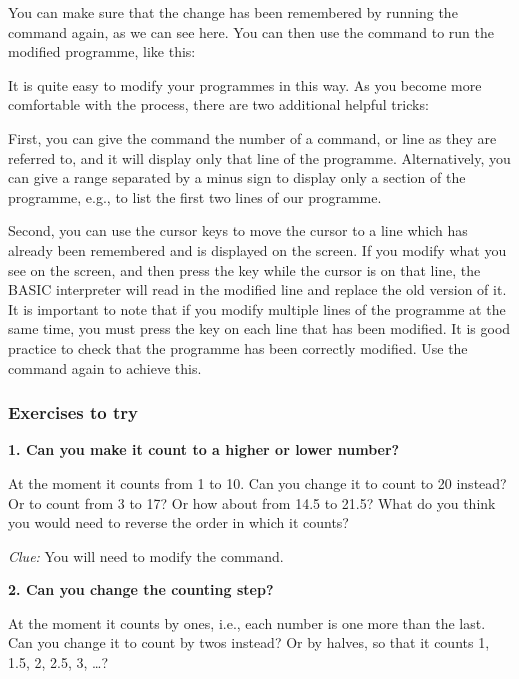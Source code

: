 You can make sure that the change has been remembered by running the  command again, as we can see here.
You can then use the  command to run the modified
programme, like this:


It is quite easy to modify your programmes in this way.  As you become more comfortable with the process, there are two
additional helpful tricks:

First, you can give the  command the number of a command, or line as they are referred to, and it will display only
that line of the programme.  Alternatively, you can give a range separated by a minus sign to display only a section of the programme,
e.g.,  to list the first two lines of our programme.

Second, you can use the cursor keys to move the cursor to a line which has already been remembered and is displayed on the screen. If you
modify what you see on the screen, and then press the  key while the cursor is on that line, the BASIC interpreter will
read in the modified line and replace the old version of it.  It is important to note that if you modify multiple lines of the programme
at the same time, you must press the  key on each line that has been modified. It is good practice to check that the
programme has been correctly modified. Use the  command again to achieve this.


  \subsubsection{Exercises to try}

  {\bf 1. Can you make it count to a higher or lower number?}

  At the moment it counts from 1 to 10.  Can you change it to count to 20 instead?  Or to count from 3 to 17?
  Or how about from 14.5 to 21.5? What do you think you would need to reverse the order in which it counts?

  {\em Clue:} You will need to modify the  command.

  {\bf 2. Can you change the counting step?}

  At the moment it counts by ones, i.e., each number is one more than the last.  Can you change it to count by twos
  instead? Or by halves, so that it counts 1, 1.5, 2, 2.5, 3, \ldots?

